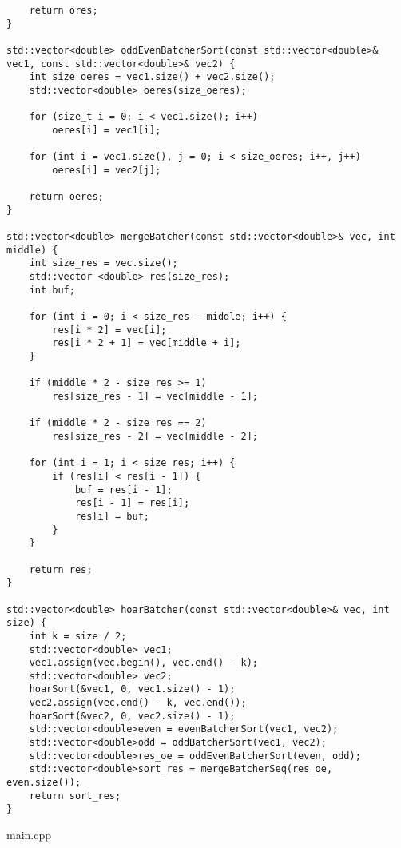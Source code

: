 \documentclass{report}
\begin{document}
\begin{lstlisting}
    return ores;
}

std::vector<double> oddEvenBatcherSort(const std::vector<double>& vec1, const std::vector<double>& vec2) {
    int size_oeres = vec1.size() + vec2.size();
    std::vector<double> oeres(size_oeres);

    for (size_t i = 0; i < vec1.size(); i++)
        oeres[i] = vec1[i];

    for (int i = vec1.size(), j = 0; i < size_oeres; i++, j++)
        oeres[i] = vec2[j];

    return oeres;
}

std::vector<double> mergeBatcher(const std::vector<double>& vec, int middle) {
    int size_res = vec.size();
    std::vector <double> res(size_res);
    int buf;

    for (int i = 0; i < size_res - middle; i++) {
        res[i * 2] = vec[i];
        res[i * 2 + 1] = vec[middle + i];
    }

    if (middle * 2 - size_res >= 1)
        res[size_res - 1] = vec[middle - 1];

    if (middle * 2 - size_res == 2)
        res[size_res - 2] = vec[middle - 2];

    for (int i = 1; i < size_res; i++) {
        if (res[i] < res[i - 1]) {
            buf = res[i - 1];
            res[i - 1] = res[i];
            res[i] = buf;
        }
    }

    return res;
}

std::vector<double> hoarBatcher(const std::vector<double>& vec, int size) {
    int k = size / 2;
    std::vector<double> vec1;
    vec1.assign(vec.begin(), vec.end() - k);
    std::vector<double> vec2;
    hoarSort(&vec1, 0, vec1.size() - 1);
    vec2.assign(vec.end() - k, vec.end());
    hoarSort(&vec2, 0, vec2.size() - 1);
    std::vector<double>even = evenBatcherSort(vec1, vec2);
    std::vector<double>odd = oddBatcherSort(vec1, vec2);
    std::vector<double>res_oe = oddEvenBatcherSort(even, odd);
    std::vector<double>sort_res = mergeBatcherSeq(res_oe, even.size());
    return sort_res;
}

\end{lstlisting}
\par main.cpp
\end{document}
